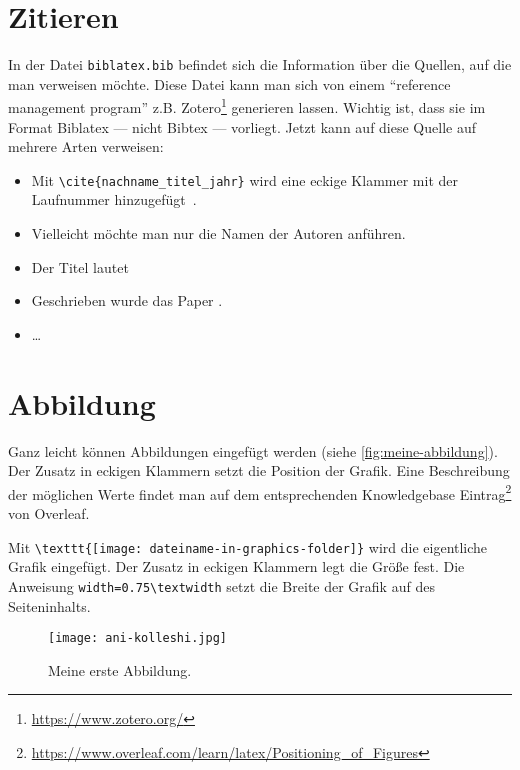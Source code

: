 \section{Zitieren}

In der Datei \verb|biblatex.bib| befindet sich die Information über die Quellen, auf die man verweisen möchte. Diese Datei kann man sich von einem ``reference management program'' z.B. Zotero\footnote{\href{https://www.zotero.org/}{https://www.zotero.org/}} generieren lassen. Wichtig ist, dass sie im Format Biblatex --- nicht Bibtex --- vorliegt. Jetzt kann auf diese Quelle auf mehrere Arten verweisen:

\begin{itemize}
    \item Mit \verb|\cite{nachname_titel_jahr}| wird eine eckige Klammer mit der Laufnummer hinzugefügt~\cite{appelman_rose_1998}.
    \item Vielleicht möchte man nur die Namen der Autoren \citeauthor[hier noch ein Zusatz]{appelman_rose_1998} anführen.
    \item Der Titel lautet 
    \item Geschrieben wurde das Paper \citeyear{appelman_rose_1998}.
    \item \dots
\end{itemize}


\section{Abbildung}

Ganz leicht können Abbildungen eingefügt werden (siehe \autoref{fig:meine-abbildung}). Der Zusatz in eckigen Klammern setzt die Position der Grafik. Eine Beschreibung der möglichen Werte findet man auf dem entsprechenden Knowledgebase Eintrag\footnote{\href{https://www.overleaf.com/learn/latex/Positioning\_of\_Figures}{https://www.overleaf.com/learn/latex/Positioning\_of\_Figures}} von Overleaf.

Mit \verb|\texttt{[image: dateiname-in-graphics-folder]}| wird die eigentliche \newline Grafik eingefügt. Der Zusatz in eckigen Klammern legt die Größe fest. Die Anweisung \verb|width=0.75\textwidth| setzt die Breite der Grafik auf  des Seiteninhalts.

\begin{figure}[h]
    \centering
    \texttt{[image: ani-kolleshi.jpg]}
    \caption{Meine erste Abbildung.}
    \label{fig:meine-abbildung}
\end{figure}


